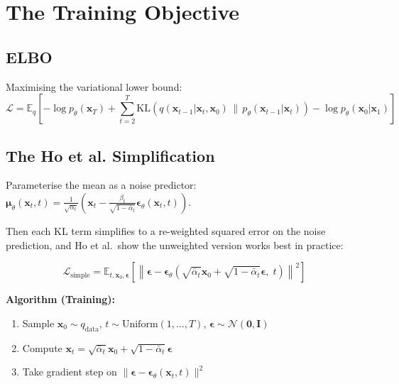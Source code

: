 \documentclass[11pt, a4paper]{article}
\theoremstyle{definition}
\newcommand{\bx}{\bm{x}}
\newcommand{\bepsilon}{\bm{\epsilon}}
\newcommand{\bmu}{\bm{\mu}}
\newcommand{\bI}{\bm{I}}
\newcommand{\E}{\mathbb{E}}
\newcommand{\N}{\mathcal{N}}
\newcommand{\KL}{\mathrm{KL}}
\newcommand{\abar}{\bar{\alpha}}
\begin{document}
\section{The Training Objective}

\subsection{ELBO}

Maximising the variational lower bound:
\begin{equation}
  \mathcal{L} = \E_q\!\left[-\log p_\theta(\bx_T) + \sum_{t=2}^T
  \KL\!\left(q(\bx_{t-1}|\bx_t,\bx_0)\,\|\,p_\theta(\bx_{t-1}|\bx_t)\right)
  - \log p_\theta(\bx_0|\bx_1)\right]
\end{equation}

\subsection{The Ho et al. Simplification}

Parameterise the mean as a noise predictor: $\bmu_\theta(\bx_t, t) = \frac{1}{\sqrt{\alpha_t}}
\!\left(\bx_t - \frac{\beta_t}{\sqrt{1-\abar_t}}\bepsilon_\theta(\bx_t, t)\right)$.

Then each KL term simplifies to a re-weighted squared error on the noise prediction, and
Ho et al.\ show the unweighted version works best in practice:

\begin{equation}
  \boxed{\mathcal{L}_\mathrm{simple} = \E_{t, \bx_0, \bepsilon}\!\left[
  \left\|\bepsilon - \bepsilon_\theta\!\left(\sqrt{\abar_t}\bx_0 + \sqrt{1-\abar_t}\bepsilon,\; t\right)\right\|^2
  \right]}
  \label{eq:simple_loss}
\end{equation}

\textbf{Algorithm (Training):}
\begin{enumerate}[noitemsep]
  \item Sample $\bx_0 \sim q_\mathrm{data}$, $t \sim \mathrm{Uniform}(1,\ldots,T)$,
        $\bepsilon \sim \N(\bm{0},\bI)$
  \item Compute $\bx_t = \sqrt{\abar_t}\bx_0 + \sqrt{1-\abar_t}\bepsilon$
  \item Take gradient step on $\|\bepsilon - \bepsilon_\theta(\bx_t, t)\|^2$
\end{enumerate}

\end{document}
